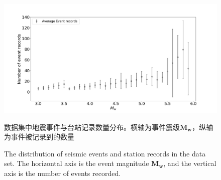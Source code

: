 \begin{figure}[h] 
\centering 
\includegraphics[width=\linewidth]{img/M-N.png} 
\renewcommand{\figurename}{图} 
\caption{数据集中地震事件与台站记录数量分布。横轴为事件震级$\mathbf{M}_{\mathbf{w}}$，纵轴为事件被记录到的数量} 
\addtocounter{figure}{-1} \vspace{-5pt} 
\renewcommand{\figurename}{Fig} 
\caption{The distribution of seismic events and station records in the data set. The horizontal axis is the event magnitude $\mathbf{M}_{\mathbf{w}}$, and the vertical axis is the number of events recorded.} 
\renewcommand{\figurename}{图} 
\label{fig:network-device-influence.png} 
\end{figure}

